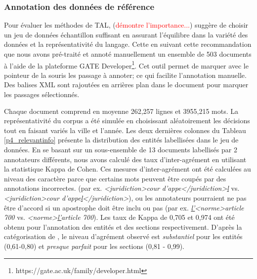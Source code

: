 \subsubsection{Annotation des données de référence}
Pour évaluer les méthodes de TAL, \citet{xiao2010corpuscreation} (\textcolor{red}{démontre l'importance...}) suggère de choisir un jeu de données échantillon suffisant en assurant l'équilibre dans la variété des données et la représentativité du langage. Cette en suivant cette recommandation que nous avons pré-traité et annoté manuellement un ensemble de 503 documents à l'aide de la plateforme GATE Developer\footnote{https://gate.ac.uk/family/developer.html}. Cet outil permet de marquer avec le pointeur de la souris les passage à annoter; ce qui facilite l'annotation manuelle. Des balises XML sont rajoutées en arrières plan dans le document pour marquer les passages sélectionnés.

Chaque document comprend en moyenne 262,257 lignes et 3955,215 mots. La représentativité du corpus a été simulée en choisissant aléatoirement les décisions tout en faisant variés la ville et l'année. Les deux dernières colonnes du Tableau \ref{p4_relevantinfo} présente la distribution des entités labellisées dans le jeu de données. En se basant sur un sous-ensemble de 13 documents labellisés par 2 annotateurs différents, nous avons calculé des taux d'inter-agrément en utilisant la statistique Kappa de Cohen. Ces mesures d'inter-agrément ont été calculées au niveau des caractère parce que certains mots peuvent être coupés par des annotations incorrectes. (par ex. \textit{<juridiction>cour d'appe</juridiction>\underline{l}} vs. \textit{<juridiction>cour d'appe\underline{l}</juridiction>}), ou les annotateurs pourraient ne pas être d'accord si un apostrophe doit être inclu ou pas (par ex. \textit{ \underline{l'}<norme>article 700} vs. \textit{ <norme>\underline{l'}article 700}). Les taux de Kappa de 0,705 et 0,974 ont été obtenu pour l'annotation des entités et des sections respectivement. D'après la catégorisation de \citet{viera2005kappa}, le niveau d'agrément observé est \textit{substantiel} pour les entités (0,61-0,80) et \textit{presque parfait} pour les sections (0,81 - 0,99).

